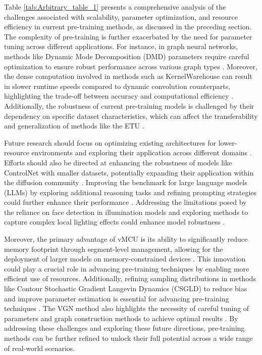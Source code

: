 Table \ref{tab:Arbitrary_table_1} presents a comprehensive analysis of the challenges associated with scalability, parameter optimization, and resource efficiency in current pre-training methods, as discussed in the preceding section. The complexity of pre-training is further exacerbated by the need for parameter tuning across different applications. For instance, in graph neural networks, methods like Dynamic Mode Decomposition (DMD) parameters require careful optimization to ensure robust performance across various graph types \cite{shi2024graphneuralnetworksmeet}. Moreover, the dense computation involved in methods such as KernelWarehouse can result in slower runtime speeds compared to dynamic convolution counterparts, highlighting the trade-off between accuracy and computational efficiency \cite{li2023kernelwarehouseparameterefficientdynamicconvolution}. Additionally, the robustness of current pre-training models is challenged by their dependency on specific dataset characteristics, which can affect the transferability and generalization of methods like the ETU \cite{zhang2024universaladversarialperturbationsvisionlanguage}.

Future research should focus on optimizing existing architectures for lower-resource environments and exploring their application across different domains \cite{tan2023hhtrackhyperspectralobjecttracking}. Efforts should also be directed at enhancing the robustness of models like ControlNet with smaller datasets, potentially expanding their application within the diffusion community \cite{zhang2023adding}. Improving the benchmark for large language models (LLMs) by exploring additional reasoning tasks and refining prompting strategies could further enhance their performance \cite{kojima2022large}. Addressing the limitations posed by the reliance on face detection in illumination models and exploring methods to capture complex local lighting effects could enhance model robustness \cite{legendre2020learningilluminationdiverseportraits}.

Moreover, the primary advantage of vMCU is its ability to significantly reduce memory footprint through segment-level management, allowing for the deployment of larger models on memory-constrained devices \cite{zheng2024vmcucoordinatedmemorymanagement}. This innovation could play a crucial role in advancing pre-training techniques by enabling more efficient use of resources. Additionally, refining sampling distributions in methods like Contour Stochastic Gradient Langevin Dynamics (CSGLD) to reduce bias and improve parameter estimation is essential for advancing pre-training techniques \cite{deng2022contourstochasticgradientlangevin}. The VGN method also highlights the necessity of careful tuning of parameters and graph construction methods to achieve optimal results \cite{shin2018deepvesselsegmentationlearning}. By addressing these challenges and exploring these future directions, pre-training methods can be further refined to unlock their full potential across a wide range of real-world scenarios.

